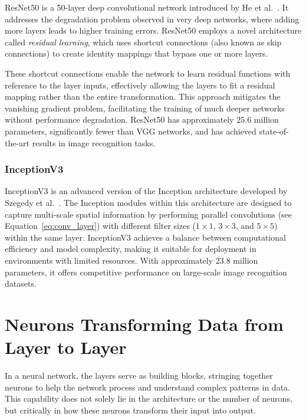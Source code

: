 ResNet50 is a 50-layer deep convolutional network introduced by He et al.~\cite{he2015deep}. It addresses the degradation problem observed in very deep networks, where adding more layers leads to higher training errors. ResNet50 employs a novel architecture called \textit{residual learning}, which uses shortcut connections (also known as skip connections) to create identity mappings that bypass one or more layers.

These shortcut connections enable the network to learn residual functions with reference to the layer inputs, effectively allowing the layers to fit a residual mapping rather than the entire transformation. This approach mitigates the vanishing gradient problem, facilitating the training of much deeper networks without performance degradation. ResNet50 has approximately 25.6 million parameters, significantly fewer than VGG networks, and has achieved state-of-the-art results in image recognition tasks.

\subsubsection{InceptionV3}

InceptionV3 is an advanced version of the Inception architecture developed by Szegedy et al.~\cite{szegedy2015rethinking}. The Inception modules within this architecture are designed to capture multi-scale spatial information by performing parallel convolutions (see Equation~\ref{eq:conv_layer}) with different filter sizes ($1 \times 1$, $3 \times 3$, and $5 \times 5$) within the same layer. InceptionV3 achieves a balance between computational efficiency and model complexity, making it suitable for deployment in environments with limited resources. With approximately 23.8 million parameters, it offers competitive performance on large-scale image recognition datasets.

\section{Neurons Transforming Data from Layer to Layer}
\label{Sec:process}

In a neural network, the layers serve as building blocks, stringing together neurons to help the network process and understand complex patterns in data. This capability does not solely lie in the architecture or the number of neurons, but critically in how these neurons transform their input into output. 
